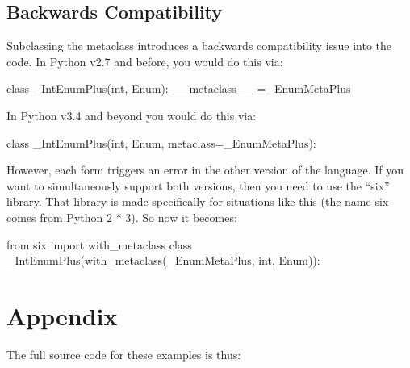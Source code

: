 \documentclass[12pt]{article}
\begin{document}
\subsection{Backwards Compatibility}\label{h2:Backwards_compatibility}
Subclassing the metaclass introduces a backwards compatibility issue into the code.  In Python v2.7 and before, you would do this via:

\begin{Python}
class _IntEnumPlus(int, Enum):
    __metaclass__ =_EnumMetaPlus
\end{Python}

In Python v3.4 and beyond you would do this via:

\begin{Python}
class _IntEnumPlus(int, Enum, metaclass=_EnumMetaPlus):
\end{Python}

However, each form triggers an error in the other version of the language.  If you want to simultaneously support both versions, then you need to use the “six” library.  That library is made specifically for situations like this (the name six comes from Python 2 * 3).  So now it becomes:

\begin{Python}
from six import with_metaclass
class _IntEnumPlus(with_metaclass(_EnumMetaPlus, int, Enum)):
\end{Python}

\section{Appendix}\label{Appendix}
The full source code for these examples is thus:
\end{document}
